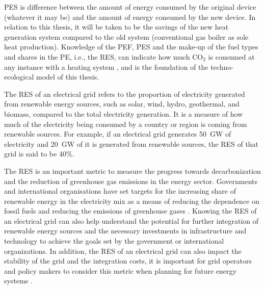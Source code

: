 \ac{PES} is difference between the amount of energy consumed by the original device (whatever it may be) and the amount of energy consumed by the new device. In relation to this thesis, it will be taken to be the savings of the new heat generation system compared to the old system (conventional gas boiler as sole heat production). Knowledge of the \ac{PEF}, \ac{PES} and the make-up of the fuel types and shares in the \ac{PE}, i.e., the \ac{RES}, can indicate how much $\text{CO}_2$ is consumed at any instance with a heating system \cite{bianco_estimation_2017}, and is the foundation of the techno-ecological model of this thesis. 

The \ac{RES} of an electrical grid refers to the proportion of electricity generated from renewable energy sources, such as solar, wind, hydro, geothermal, and biomass, compared to the total electricity generation. It is a measure of how much of the electricity being consumed by a country or region is coming from renewable sources. For example, if an electrical grid generates \qty{50}{\giga\watt} of electricity and \qty{20}{\giga\watt}  of it is generated from renewable sources, the \ac{RES} of that grid is said to be 40\%.

The \ac{RES} is an important metric to measure the progress towards decarbonization and the reduction of greenhouse gas emissions in the energy sector. Governments and international organisations have set targets for the increasing share of renewable energy in the electricity mix as a means of reducing the dependence on fossil fuels and reducing the emissions of greenhouse gases \cite{sachs2022sustainable}. Knowing the \ac{RES} of an electrical grid can also help understand the potential for further integration of renewable energy sources and the necessary investments in infrastructure and technology to achieve the goals set by the government or international organizations. In addition, the \ac{RES} of an electrical grid can also impact the stability of the grid and the integration costs, it is important for grid operators and policy makers to consider this metric when planning for future energy systems \cite{sachs2022sustainable}.


